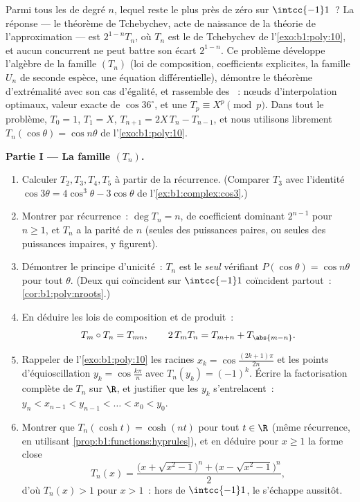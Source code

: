 \begin{problem}\label{pb:b1:poly:1}
Parmi tous les  \emph{} de degré $n$, lequel reste
le plus près de zéro sur $\intcc{-1}1$~? La réponse --- le théorème
de Tchebychev, acte de naissance de la théorie de l'approximation
--- est $2^{1-n}T_n$, où $T_n$ est le  de Tchebychev de
l'\cref{exo:b1:poly:10}, et aucun concurrent  ne peut battre
son écart $2^{1-n}$. Ce problème
développe l'algèbre de la famille $(T_n)$ (loi de composition,
coefficients explicites, la famille $U_n$ de seconde espèce, une
équation différentielle), démontre le théorème d'extrémalité avec
son cas d'égalité, et rassemble des ~: nœuds
d'interpolation optimaux, valeur exacte de $\cos 36^\circ$, et une
 $T_p \equiv X^p \pmod p$. Dans tout le problème, $T_0 =
1$, $T_1 = X$, $T_{n+1} = 2X\,T_n - T_{n-1}$, et nous utilisons
librement $T_n(\cos\theta) = \cos n\theta$ de l'\cref{exo:b1:poly:10}.

\medskip
\noindent\textbf{Partie I --- La famille $(T_n)$.}
\begin{enumerate}
  \item Calculer $T_2, T_3, T_4, T_5$ à partir de la récurrence.
        (Comparer $T_3$ avec l'identité $\cos3\theta = 4\cos^3\theta
        - 3\cos\theta$ de l'\cref{ex:b1:complex:cos3}.)
  \item Montrer par récurrence~: $\deg T_n = n$, de coefficient
        dominant $2^{n-1}$ pour $n \geq 1$, et $T_n$ a la parité de
        $n$ (seules des puissances paires, ou seules des puissances
        impaires, y figurent).
  \item Démontrer le principe d'unicité~: $T_n$ est le \emph{seul}
         vérifiant $P(\cos\theta) = \cos n\theta$ pour tout
        $\theta$. (Deux  qui coïncident sur $\intcc{-1}1$
        coïncident partout~: \cref{cor:b1:poly:nroots}.)
  \item En déduire les lois de composition et de produit~:
        \[
        T_m \circ T_n = T_{mn},
        \qquad
        2\,T_m T_n = T_{m+n} + T_{\abs{m-n}} .
        \]
  \item Rappeler de l'\cref{exo:b1:poly:10} les racines $x_k =
        \cos\frac{(2k+1)\pi}{2n}$ et les points d'équioscillation
        $y_k = \cos\frac{k\pi}n$ avec $T_n(y_k) = (-1)^k$. Écrire la
        factorisation complète de $T_n$ sur $\R$, et justifier que
        les $y_k$ s'entrelacent~: $y_n < x_{n-1} < y_{n-1} < \dots <
        x_0 < y_0$.
  \item Montrer que $T_n(\cosh t) = \cosh(nt)$ pour tout $t \in \R$
        (même récurrence, en utilisant
        \cref{prop:b1:functions:hyprules}), et en déduire pour $x
        \geq 1$ la forme close
        \[
        T_n(x) = \frac{\bigl(x + \sqrt{x^2 - 1}\bigr)^n +
        \bigl(x - \sqrt{x^2 - 1}\bigr)^n}{2} ,
        \]
        d'où $T_n(x) > 1$ pour $x > 1$~: hors de $\intcc{-1}1$, le
         s'échappe aussitôt.
\end{enumerate}


\end{problem}
